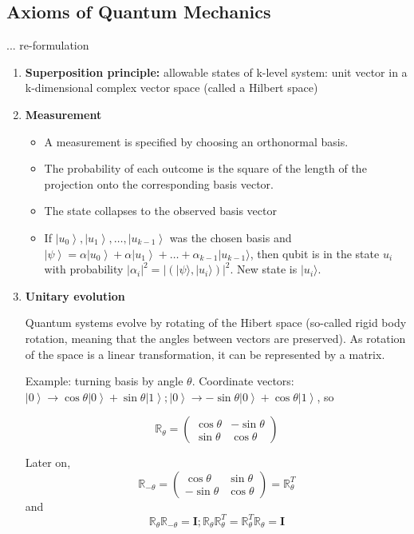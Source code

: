 \documentclass{scrartcl}
\newcommand{\bigR}{\mathbb{R}} %
\newcommand{\ket}[1]{\left| #1 \right>} %
\begin{document}
\subsection{Axioms of Quantum Mechanics}
\label{sec:5-2}
... re-formulation
\begin{enumerate}
\item {\bf Superposition principle: } allowable states of k-level system: unit
  vector in a k-dimensional complex vector space (called a Hilbert space)

\item {\bf Measurement}

  \begin{itemize}
  \item A measurement is specified by choosing an orthonormal basis.
  \item The probability of each outcome is the square of the length of the
    projection onto the corresponding basis vector.
  \item The state collapses to the observed basis vector
  \item If $\ket{u_0}, \ket{u_1}, \dots, \ket{u_{k-1}}$ was the chosen basis and
    $\ket\psi = \alpha \ket{u_0} + \alpha \ket{u_1} + \dots + \alpha_{k-1} |
    u_{k-1}\rangle$, then qubit is in the state $u_i$ with probability
    $|\alpha_i|^2 = |(|\psi \rangle,|u_i\rangle)|^2$. New state is
    $|u_i\rangle$.
  \end{itemize}


\item {\bf Unitary evolution}

  Quantum systems evolve by rotating of the Hibert space (so-called rigid body
  rotation, meaning that the angles between vectors are preserved). As rotation
  of the space is a linear transformation, it can be represented by a matrix.

  Example: turning basis by angle $\theta$. Coordinate vectors: $\ket0 \to \cos
  \theta \ket0 + \sin \theta \ket1;\ket0 \to - \sin \theta \ket0 + \cos \theta
  \ket1$, so

\[\bigR_\theta = \left( \begin{array}{cc}\cos\theta &-\sin\theta \\ \sin
    \theta & \cos\theta\end{array}  \right)\]

Later on, \[ \bigR_{- \theta} = \left( \begin{array}{cc} \cos \theta & \sin
    \theta \\ -\sin \theta & \cos \theta \end{array} \right) =
\bigR_\theta^T \] and \[ \bigR_\theta \bigR_{-\theta} =
\mathbf{I}; \bigR_\theta \bigR_{\theta}^T = \bigR_\theta^T
\bigR_{\theta} = \mathbf{I} \]
\end{enumerate}
\end{document}
